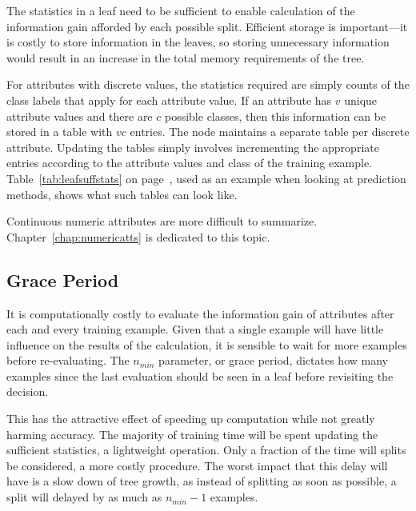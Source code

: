 The statistics in a leaf need to be sufficient to enable calculation of the information gain afforded by each possible split. Efficient storage is important---it is costly to store information in the leaves, so storing unnecessary information would result in an increase in the total memory requirements of the tree.

For attributes with discrete values, the statistics required are simply counts of the class labels that apply for each attribute value. If an attribute has $v$ unique attribute values and there are $c$ possible classes, then this information can be stored in a table with $vc$ entries. The node maintains a separate table per discrete attribute. Updating the tables simply involves incrementing the appropriate entries according to the attribute values and class of the training example.
Table~\ref{tab:leafsuffstats} on page~\pageref{tab:leafsuffstats}, used as an example when looking at prediction methods, shows what such tables can look like.

Continuous numeric attributes are more difficult to summarize. Chapter~\ref{chap:numericatts} is dedicated to this topic.

\subsection{Grace Period}
\label{sec:graceperiod}

It is computationally costly to evaluate the information gain of attributes after each and every training example. Given that a single example will have little influence on the results of the calculation, it is sensible to wait for more examples before re-evaluating. The $n_{min}$ parameter, or grace period, dictates how many examples since the last evaluation should be seen in a leaf before revisiting the decision.

This has the attractive effect of speeding up computation while not greatly harming accuracy. The majority of training time will be spent updating the sufficient statistics, a lightweight operation. Only a fraction of the time will splits be considered, a more costly procedure. The worst impact that this delay will have is a slow down of tree growth, as instead of splitting as soon as possible, a split will delayed by as much as $n_{min}-1$ examples.

